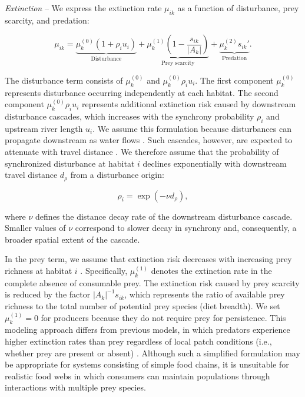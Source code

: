 \documentclass[11pt, class=article, crop=false]{standalone}
\theoremstyle{definition}
\begin{document}
\textit{Extinction} --
We express the extinction rate $\mu_{ik}$ as a function of disturbance, prey scarcity, and predation:

\begin{equation}
    \mu_{ik} 
    = 
    \underbrace{\mu_{k}^{(0)} (1 + \rho_i u_i)}_{\text{Disturbance}} + 
    \underbrace{\mu_{k}^{(1)} \left(1 - \frac{s_{ik}}{|A_k|} \right)}_{\text{Prey scarcity}} + 
    \underbrace{\mu_{k}^{(2)} s_{ik}'}_{\text{Predation}}.
    \label{eq:extn-local}
\end{equation}

The disturbance term consists of $\mu_k^{(0)}$ and $\mu_k^{(0)} \rho_i u_i$.
The first component $\mu_k^{(0)}$ represents disturbance occurring independently at each habitat.
The second component $\mu_k^{(0)} \rho_i u_i$ represents additional extinction risk caused by downstream disturbance cascades, which increases with the synchrony probability $\rho_i$ and upstream river length $u_i$.
We assume this formulation because disturbances can propagate downstream as water flows \citep{swanson_flood_1998, nakamura_disturbance_2000, gomi_understanding_2002, massoudieh_biogeochemical_2010, messager_global_2021}.
Such cascades, however, are expected to attenuate with travel distance \citep{larsen_geography_2021, sarremejane_drought_2021, tamario_barriers_2025}.
We therefore assume that the probability of synchronized disturbance at habitat $i$ declines exponentially with downstream travel distance $d_\rho$ from a disturbance origin:

\begin{equation}
    \rho_i = \exp(- \nu d_{\rho}),
\end{equation}

where $\nu$ defines the distance decay rate of the downstream disturbance cascade.
Smaller values of $\nu$ correspond to slower decay in synchrony and, consequently, a broader spatial extent of the cascade.

In the prey term, we assume that extinction risk decreases with increasing prey richness at habitat $i$ \citep{shibasaki_food_2024}.
Specifically, $\mu_k^{(1)}$ denotes the extinction rate in the complete absence of consumable prey.
The extinction risk caused by prey scarcity is reduced by the factor $|A_k|^{-1}s_{ik}$, which represents the ratio of available prey richness to the total number of potential prey species (diet breadth).
We set $\mu_k^{(1)}=0$ for producers because they do not require prey for persistence.
This modeling approach differs from previous models, in which predators experience higher extinction rates than prey regardless of local patch conditions (i.e., whether prey are present or absent) \citep[e.g.,][]{holt_food_2002, takimoto_effects_2012, calcagno_constraints_2011}.
Although such a simplified formulation may be appropriate for systems consisting of simple food chains, it is unsuitable for realistic food webs in which consumers can maintain populations through interactions with multiple prey species.
\end{document}
